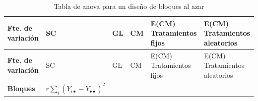 \documentclass[]{book}
\theoremstyle{definition}
\theoremstyle{definition}
\theoremstyle{definition}
\theoremstyle{remark}
\begin{document}
\begin{longtable}[]{@{}llllll@{}}
\caption{\label{tab:anova-bloque-azar} Tabla de anova para un diseño de
bloques al azar}\tabularnewline
\toprule
\begin{minipage}[b]{0.03\columnwidth}\raggedright
\textbf{Fte. de variación}\strut
\end{minipage} & \begin{minipage}[b]{0.26\columnwidth}\raggedright
SC\strut
\end{minipage} & \begin{minipage}[b]{0.04\columnwidth}\raggedright
GL\strut
\end{minipage} & \begin{minipage}[b]{0.18\columnwidth}\raggedright
CM\strut
\end{minipage} & \begin{minipage}[b]{0.17\columnwidth}\raggedright
E(CM) Tratamientos fijos\strut
\end{minipage} & \begin{minipage}[b]{0.17\columnwidth}\raggedright
E(CM) Tratamientos aleatorios\strut
\end{minipage}\tabularnewline
\midrule
\endfirsthead
\toprule
\begin{minipage}[b]{0.03\columnwidth}\raggedright
\textbf{Fte. de variación}\strut
\end{minipage} & \begin{minipage}[b]{0.26\columnwidth}\raggedright
SC\strut
\end{minipage} & \begin{minipage}[b]{0.04\columnwidth}\raggedright
GL\strut
\end{minipage} & \begin{minipage}[b]{0.18\columnwidth}\raggedright
CM\strut
\end{minipage} & \begin{minipage}[b]{0.17\columnwidth}\raggedright
E(CM) Tratamientos fijos\strut
\end{minipage} & \begin{minipage}[b]{0.17\columnwidth}\raggedright
E(CM) Tratamientos aleatorios\strut
\end{minipage}\tabularnewline
\midrule
\endhead
\begin{minipage}[t]{0.03\columnwidth}\raggedright
\textbf{Bloques}\strut
\end{minipage} & \begin{minipage}[t]{0.26\columnwidth}\raggedright
\(r{\sum_{i}^{}\left( \overline{Y_{i \bullet}}- \overline{Y_{\bullet \bullet}} \right)}^{2}\)\strut

\end{minipage}
\end{longtable}
\end{document}
